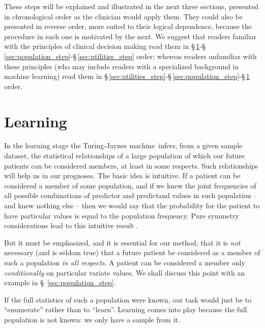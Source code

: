 \documentclass[utf8]{FrontiersinHarvard} %
\newcommand*{\sect}{\S}%
\newcommand*{\sects}{\S\S}%
\renewcommand*{\|}[1][]{\nonscript\:#1\vert\nonscript\:\mathopen{}}
\newcommand*{\tjm}{Turing-Jaynes machine}
\begin{document}
These steps will be explained and illustrated in the next three sections, presented in chronological order as the clinician would apply them. They could also be presented in reverse order, more suited to their logical dependence, because the procedure in each one is motivated by the next. We suggest that readers familiar with the principles of clinical decision making read them in \sect\,\ref{sec:learning_step}-\sect\,\ref{sec:population_step}-\sect\,\ref{sec:utilities_step} order; whereas readers unfamiliar with these principles (who may include readers with a specialized background in machine learning) read them in \sect\,\ref{sec:utilities_step}-\sect\,\ref{sec:population_step}-\sect\,\ref{sec:learning_step} order.


\section{Learning}
\label{sec:learning_step}

In the learning stage the \tjm\ infers, from a given sample dataset, the statistical relationships of a large population of which our future patients can be considered members, at least in some respects. Such relationships will help us in our prognoses. The basic idea is intuitive. If a patient can be considered a member of some population, and if we knew the joint frequencies of all possible combinations of predictor and predictand values in such population -- and knew nothing else -- then we would say that the probability for the patient to have particular values is equal to the population frequency. Pure symmetry considerations lead to this intuitive result \citep[\sects~4.2--4.3]{definetti1930,dawid2013,bernardoetal1994_r2000}.

But it must be emphasized, and it is essential for our method, that it is \emph{not} necessary (and is seldom true) that a future patient be considered as a member of such a population \emph{in all respects}. A patient can be considered a member only \emph{conditionally} on particular variate values. We shall discuss this point with an example in \sect~\ref{sec:population_step}.

If the full statistics of such a population were known, our task would just be to \enquote{enumerate} rather than to \enquote{learn}. Learning comes into play because the full population is not known: we only have a sample from it.
\end{document}
